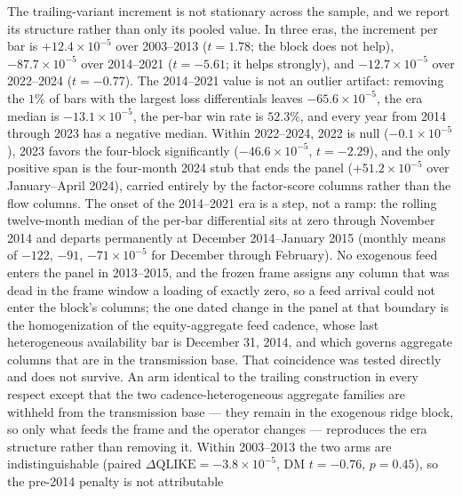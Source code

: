 The trailing-variant increment is not stationary across the sample, and
we report its structure rather than only its pooled value.
In three eras, the increment per bar is $+12.4 \times 10^{-5}$ over
2003--2013 ($t = 1.78$; the block does not help), $-87.7 \times 10^{-5}$
over 2014--2021 ($t = -5.61$; it helps strongly), and
$-12.7 \times 10^{-5}$ over 2022--2024 ($t = -0.77$). The 2014--2021
value is not an outlier artifact: removing the $1\%$ of bars with the
largest loss differentials leaves $-65.6 \times 10^{-5}$, the era median
is $-13.1 \times 10^{-5}$, the per-bar win rate is $52.3\%$, and every
year from 2014 through 2023 has a negative median. Within 2022--2024,
2022 is null ($-0.1 \times 10^{-5}$), 2023 favors the four-block
significantly ($-46.6 \times 10^{-5}$, $t = -2.29$), and the only
positive span is the four-month 2024 stub that ends the panel
($+51.2 \times 10^{-5}$ over January--April 2024), carried entirely by
the factor-score columns rather than the flow columns. The onset of the
2014--2021 era is a step, not a ramp: the rolling twelve-month median of
the per-bar differential sits at zero through November 2014 and departs
permanently at December 2014--January 2015 (monthly means of
$-122$, $-91$, $-71 \times 10^{-5}$ for December through February). No
exogenous feed enters the panel in 2013--2015, and the frozen frame
assigns any column that was dead in the frame window a loading of
exactly zero, so a feed arrival could not enter the block's columns; the
one dated change in the panel at that boundary is the homogenization of
the equity-aggregate feed cadence, whose last heterogeneous availability
bar is December 31, 2014, and which governs aggregate columns that are
in the transmission base. That coincidence was tested directly and does not survive. An arm
identical to the trailing construction in every respect except that the
two cadence-heterogeneous aggregate families are withheld from the
transmission base --- they remain in the exogenous ridge block, so only
what feeds the frame and the operator changes --- reproduces the era
structure rather than removing it. Within 2003--2013 the two arms are
indistinguishable (paired $\Delta\mathrm{QLIKE} = -3.8 \times 10^{-5}$,
DM $t = -0.76$, $p = 0.45$), so the pre-2014 penalty is not attributable
